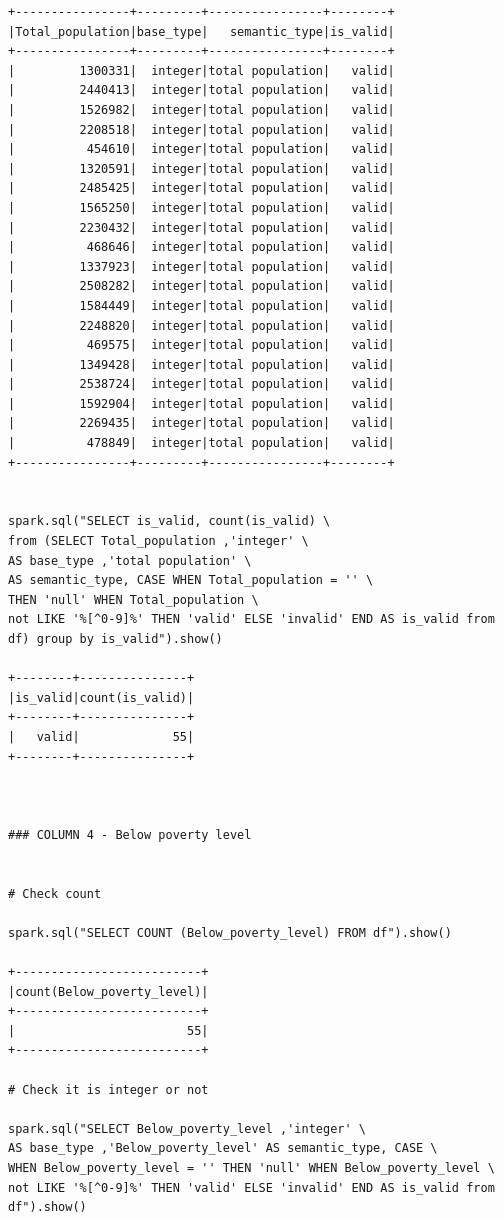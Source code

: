 \documentclass{article}
\begin{document}
\begin{verbatim}
+----------------+---------+----------------+--------+
|Total_population|base_type|   semantic_type|is_valid|
+----------------+---------+----------------+--------+
|         1300331|  integer|total population|   valid|
|         2440413|  integer|total population|   valid|
|         1526982|  integer|total population|   valid|
|         2208518|  integer|total population|   valid|
|          454610|  integer|total population|   valid|
|         1320591|  integer|total population|   valid|
|         2485425|  integer|total population|   valid|
|         1565250|  integer|total population|   valid|
|         2230432|  integer|total population|   valid|
|          468646|  integer|total population|   valid|
|         1337923|  integer|total population|   valid|
|         2508282|  integer|total population|   valid|
|         1584449|  integer|total population|   valid|
|         2248820|  integer|total population|   valid|
|          469575|  integer|total population|   valid|
|         1349428|  integer|total population|   valid|
|         2538724|  integer|total population|   valid|
|         1592904|  integer|total population|   valid|
|         2269435|  integer|total population|   valid|
|          478849|  integer|total population|   valid|
+----------------+---------+----------------+--------+


spark.sql("SELECT is_valid, count(is_valid) \  
from (SELECT Total_population ,'integer' \  
AS base_type ,'total population' \  
AS semantic_type, CASE WHEN Total_population = '' \  
THEN 'null' WHEN Total_population \  
not LIKE '%[^0-9]%' THEN 'valid' ELSE 'invalid' END AS is_valid from df) group by is_valid").show()

+--------+---------------+
|is_valid|count(is_valid)|
+--------+---------------+
|   valid|             55|
+--------+---------------+



### COLUMN 4 - Below poverty level


# Check count

spark.sql("SELECT COUNT (Below_poverty_level) FROM df").show()

+--------------------------+
|count(Below_poverty_level)|
+--------------------------+
|                        55|
+--------------------------+

# Check it is integer or not

spark.sql("SELECT Below_poverty_level ,'integer' \  
AS base_type ,'Below_poverty_level' AS semantic_type, CASE \  
WHEN Below_poverty_level = '' THEN 'null' WHEN Below_poverty_level \  
not LIKE '%[^0-9]%' THEN 'valid' ELSE 'invalid' END AS is_valid from df").show()


\end{verbatim}
\end{document}
